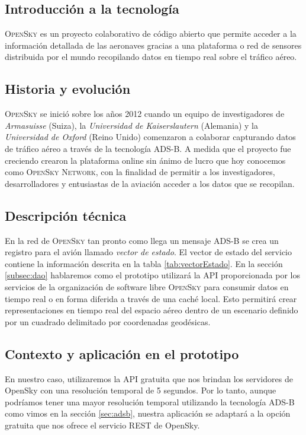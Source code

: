 \documentclass[a4paper, 11pt]{book}
\begin{document}
\subsection{Introducción a la tecnología}
\textsc{OpenSky} es un proyecto colaborativo de código abierto que permite acceder a la información detallada de las aeronaves gracias a una plataforma o red de sensores distribuida por el mundo recopilando datos en tiempo real sobre el tráfico aéreo.
\subsection{Historia y evolución}
\textsc{OpenSky} se inició sobre los años 2012 cuando un equipo de investigadores de \emph{Armasuisse} (Suiza), la \emph{Universidad de Kaiserslautern} (Alemania) y la \emph{Universidad de Oxford} (Reino Unido) comenzaron a colaborar capturando datos de tráfico aéreo a través de la tecnología \textsc{ADS-B}.
A medida que el proyecto fue creciendo crearon la plataforma online sin ánimo de lucro que hoy conocemos como \textsc{OpenSky Network}, con la finalidad de permitir a los investigadores, desarrolladores y entusiastas de la aviación acceder a los datos que se recopilan.
\subsection{Descripción técnica}
En la red de \textsc{OpenSky} tan pronto como llega un mensaje \textsc{ADS-B} se crea un registro para el avión llamado \emph{vector de estado}.
El vector de estado del servicio contiene la información descrita en la tabla \ref{tab:vectorEstado}.
En la sección \ref{subsec:dao} hablaremos como el prototipo utilizará la \textsc{\gls{API}} proporcionada por los servicios de la organización de software libre \textsc{OpenSky} para consumir datos en tiempo real o en forma diferida a través de una caché local. Esto permitirá crear representaciones en tiempo real del espacio aéreo dentro de un escenario definido por un cuadrado delimitado por coordenadas geodésicas.

\subsection{Contexto y aplicación en el prototipo}
En nuestro caso, utilizaremos la API gratuita que nos brindan los servidores de OpenSky con una resolución temporal de 5 segundos. Por lo tanto, aunque podríamos tener una mayor resolución temporal utilizando la tecnología ADS-B como vimos en la sección \ref{sec:adsb}, nuestra aplicación se adaptará a la opción gratuita que nos ofrece el servicio REST de OpenSky.
\end{document}
